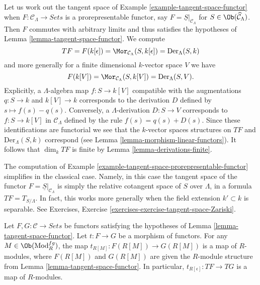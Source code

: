 \begin{example}
\label{example-tangent-space-prorepresentable-functor}
Let us work out the tangent space of
Example \ref{example-tangent-space-functor}
when $F : \mathcal{C}_\Lambda \to \textit{Sets}$ is a
prorepresentable functor, say $F = \underline{S}|_{\mathcal{C}_\Lambda}$
for $S \in \Ob(\widehat{\mathcal{C}}_\Lambda)$. Then $F$ commutes
with arbitrary limits and thus satisfies the hypotheses of
Lemma \ref{lemma-tangent-space-functor}.
We compute
$$
TF = F(k[\epsilon]) = \Mor_{\mathcal{C}_\Lambda}(S, k[\epsilon])
= \text{Der}_\Lambda(S, k)
$$
and more generally for a finite dimensional $k$-vector space $V$ we have
$$
F(k[V]) = \Mor_{\mathcal{C}_\Lambda}(S, k[V]) = \text{Der}_\Lambda(S, V).
$$
Explicitly, a $\Lambda$-algebra map $f : S \to k[V]$ compatible with
the augmentations $q : S \to k$ and $k[V] \to k$ corresponds to the derivation
$D$ defined by $s \mapsto f(s) - q(s)$. Conversely, a
$\Lambda$-derivation $D : S \to V$ corresponds to $f : S \to k[V]$
in $\mathcal{C}_\Lambda$ defined by the rule $f(s) = q(s) + D(s)$. Since
these identifications are functorial we see that the $k$-vector spaces
structures on $TF$ and $\text{Der}_\Lambda(S, k)$ correspond (see
Lemma \ref{lemma-morphism-linear-functors}).
It follows that $\dim_k TF$ is finite by
Lemma \ref{lemma-derivations-finite}.
\end{example}

\begin{example}
\label{example-tangent-space-classical-prorepresentable-functor}
The computation of
Example \ref{example-tangent-space-prorepresentable-functor}
simplifies in the classical case. Namely, in this case
the tangent space of the functor
$F = \underline{S}|_{\mathcal{C}_\Lambda}$ is simply the
relative cotangent space of $S$ over $\Lambda$, in a formula
$TF = T_{S/\Lambda}$. In fact, this works more generally when the
field extension $k' \subset k$ is separable. See
Exercises, Exercise \ref{exercises-exercise-tangent-space-Zariski}.
\end{example}

\begin{lemma}
\label{lemma-morphism-tangent-spaces}
Let $F, G: \mathcal{C} \to \textit{Sets}$ be functors satisfying
the hypotheses of
Lemma \ref{lemma-tangent-space-functor}.
Let $t : F \to G$ be a morphism of functors. For any
$M \in \Ob(\text{Mod}^{fg}_R)$, the map
$t_{R[M]}: F(R[M]) \to G(R[M])$ is a map of $R$-modules, where
$F(R[M])$ and $G(R[M])$ are given the $R$-module structure from
Lemma \ref{lemma-tangent-space-functor}.
In particular, $t_{R[\epsilon]} : TF \to TG$ is a map of $R$-modules.
\end{lemma}

